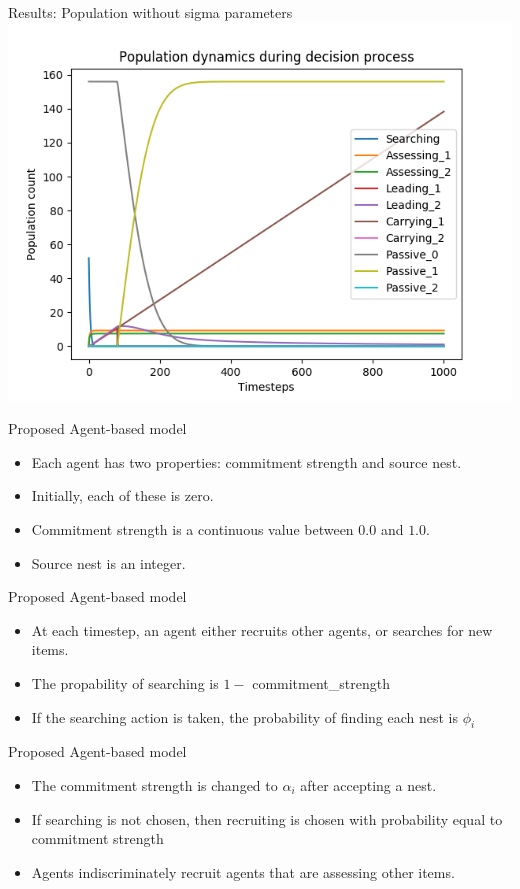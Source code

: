 \documentclass{beamer}
\begin{document}
\begin{frame}{Results: Population without sigma parameters}
    \includegraphics[scale=0.7]{populations_saldyt_2018_no_sigma}
\end{frame}

\begin{frame}{Proposed Agent-based model}
    \begin{itemize}
        \item Each agent has two properties: commitment strength and source nest.
        \item Initially, each of these is zero.
        \item Commitment strength is a continuous value between $0.0$ and $1.0$.
        \item Source nest is an integer.
    \end{itemize}
\end{frame}

\begin{frame}{Proposed Agent-based model}
    \begin{itemize}
        \item At each timestep, an agent either recruits other agents, or searches for new items.
        \item The propability of searching is $1 - $ commitment\_strength
        \item If the searching action is taken, the probability of finding each nest is $\phi_i$
    \end{itemize}
\end{frame}

\begin{frame}{Proposed Agent-based model}
    \begin{itemize}
        \item The commitment strength is changed to $\alpha_i$ after accepting a nest.
        \item If searching is not chosen, then recruiting is chosen with probability equal to commitment strength
        \item Agents indiscriminately recruit agents that are assessing other items.
    \end{itemize}
\end{frame}
\end{document}

